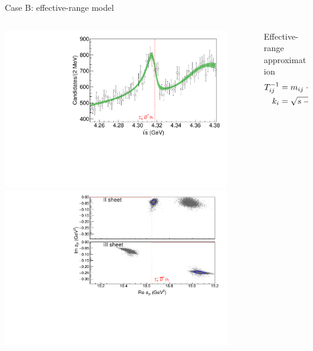 \documentclass[aspectratio=169]{beamer}
\begin{document}
\begin{frame}[noframenumbering]{Case B: effective-range model}%
\begin{columns}
    \begin{column}{0.4\textwidth}
        \begin{center}
            \includegraphics[width=0.9\textwidth]{figs/PcJPAC/plot_yc.pdf}\\
            \includegraphics[width=0.9\textwidth]{figs/PcJPAC/general_yc.pdf}
        \end{center}
    \end{column}
    \begin{column}{0.57\textwidth}
        \begin{block}{Effective-range approximation}
            \begin{align*}
                T^{-1}_{ij} &= m_{ij} + {\color{red} c_{ij} s} - i k_i \delta_{ij},\\
                k_i &= \sqrt{s-s_i}

\end{align*}
\end{block}
\end{column}
\end{columns}
\end{frame}
\end{document}
